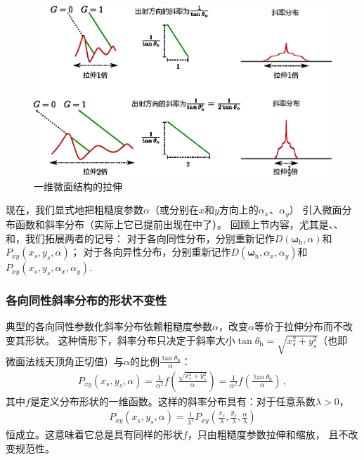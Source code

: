 \begin{figure}[htbp]
    \centering
    \includegraphics[width=\linewidth]{Pictures/chap08/Stretch1D.eps}
    \caption{一维微面结构的拉伸}
    \label{fig:08ex01-Stretch1D}
\end{figure}

现在，我们显式地把粗糙度参数$\alpha$（或分别在$x$和$y$方向上的$\alpha_x$、$\alpha_y$）
引入微面分布函数和斜率分布（实际上它已提前出现在中了）。
回顾上节内容，尤其是、、
和，我们拓展两者的记号：
对于各向同性分布，分别重新记作$D({\bm\omega}_{\mathrm{h}},\alpha)$和$P_{xy}(x_s,y_s,\alpha)$；
对于各向异性分布，分别重新记作$D({\bm\omega}_{\mathrm{h}},\alpha_x,\alpha_y)$和$P_{xy}(x_s,y_s,\alpha_x,\alpha_y)$.

\subsubsection*{各向同性斜率分布的形状不变性}
典型的各向同性参数化斜率分布依赖粗糙度参数$\alpha$，改变$\alpha$等价于拉伸分布而不改变其形状。
这种情形下，斜率分布只决定于斜率大小$\displaystyle\tan\theta_{\mathrm{h}}=\sqrt{x_s^2+y_s^2}$（也即
微面法线天顶角正切值）与$\alpha$的比例$\displaystyle\frac{\tan\theta_{\mathrm{h}}}{\alpha}$：
\begin{align}\label{eq:08-ex01-isotropic-shape-invariant}
    P_{xy}(x_s,y_s,\alpha)=\frac{1}{\alpha^2}f\left(\frac{\sqrt{x_s^2+y_s^2}}{\alpha}\right)=\frac{1}{\alpha^2}f\left(\frac{\tan\theta_{\mathrm{h}}}{\alpha}\right)\, ,
\end{align}
其中$f$是定义分布形状的一维函数。这样的斜率分布具有：对于任意系数$\lambda>0$，
\begin{align}\label{eq:08-ex01-any-coef-invariant}
    P_{xy}(x_s,y_s,\alpha)=\frac{1}{\lambda^2}P_{xy}(\frac{x_s}{\lambda},\frac{y_s}{\lambda},\frac{\alpha}{\lambda})
\end{align}
恒成立。这意味着它总是具有同样的形状$f$，只由粗糙度参数拉伸和缩放，
且不改变规范性。

